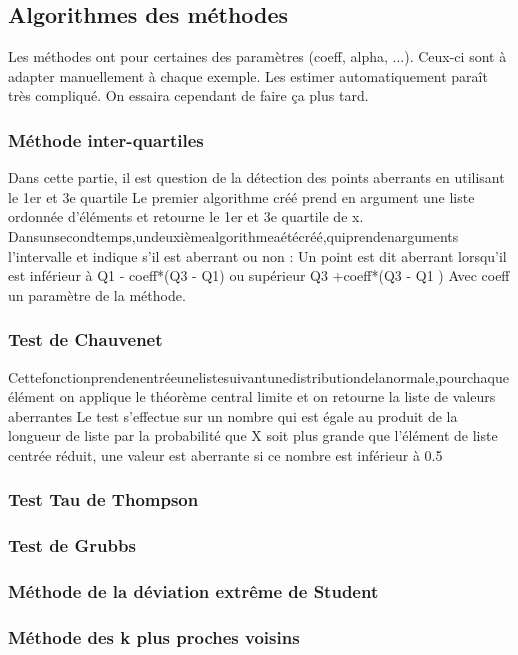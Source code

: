 \documentclass[a4paper,12pt]{article} %
\begin{document}
\subsection{Algorithmes des méthodes}
Les méthodes ont pour certaines des paramètres (coeff, alpha, ...). Ceux-ci sont à adapter manuellement à chaque exemple.
Les estimer automatiquement paraît très compliqué. On essaira cependant de faire ça plus tard.

\subsubsection{Méthode inter-quartiles}
Dans cette partie, il est question de la détection des points aberrants en utilisant le 1er et 3e quartile Le premier algorithme créé prend en argument une liste ordonnée d’éléments et retourne le 1er et 3e quartile de x. Dansunsecondtemps,undeuxièmealgorithmeaétécréé,quiprendenarguments l'intervalle et indique s'il est aberrant ou non : Un point est dit aberrant lorsqu’il est inférieur à Q1 - coeff*(Q3 - Q1) ou supérieur Q3 +coeff*(Q3 - Q1 )
Avec coeff un paramètre de la méthode.

\subsubsection{Test de Chauvenet}
Cettefonctionprendenentréeunelistesuivantunedistributiondelanormale,pourchaque élément on applique le théorème central limite et on retourne la liste de valeurs aberrantes Le test s’eﬀectue sur un nombre qui est égale au produit de la longueur de liste par la probabilité que X soit plus grande que l’élément de liste centrée réduit, une valeur est aberrante si ce nombre est inférieur à 0.5

\subsubsection{Test Tau de Thompson}
\subsubsection{Test de Grubbs}
\subsubsection{Méthode de la déviation extrême de Student}
\subsubsection{Méthode des k plus proches voisins}
\end{document}
